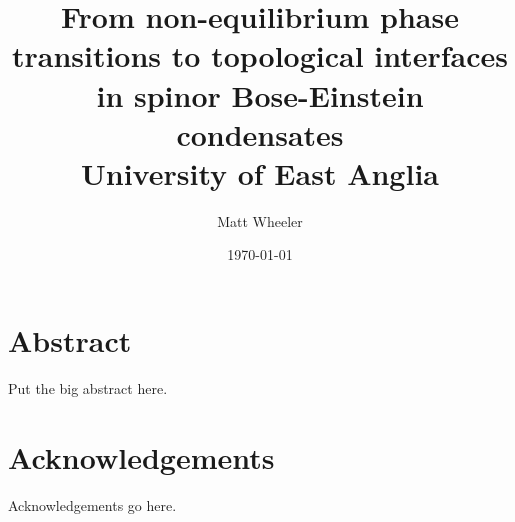 \documentclass[a4paper, oneside, 11pt]{memoir}
\title{From non-equilibrium phase transitions to topological interfaces in
spinor Bose-Einstein condensates\\
{\Large University of East Anglia}}
\author{Matt Wheeler}
\date{\today}
\begin{document}
\maketitle

\frontmatter
\chapter*{Abstract}
Put the big abstract here.

\chapter*{Acknowledgements}
Acknowledgements go here.

\tableofcontents

\mainmatter{}








\appendix


\backmatter{}
\printbibliography{}
\end{document}
